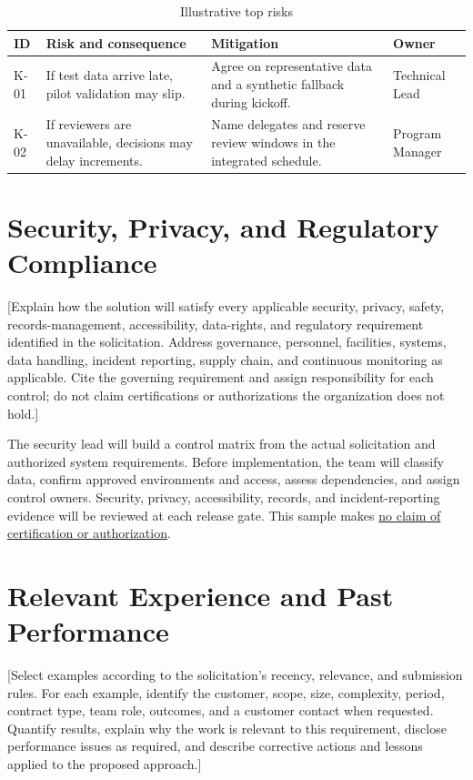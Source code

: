 \begin{table}[htbp]
\centering
\caption{Illustrative top risks}
\label{tab:risks}
\begin{tabularx}{\textwidth}{@{}lXXl@{}}
\toprule
ID & Risk and consequence & Mitigation & Owner \\
\midrule
K-01 & If test data arrive late, pilot validation may slip. & Agree on representative data and a synthetic fallback during kickoff. & Technical Lead \\
K-02 & If reviewers are unavailable, decisions may delay increments. & Name delegates and reserve review windows in the integrated schedule. & Program Manager \\
\bottomrule
\end{tabularx}
\end{table}

\section{Security, Privacy, and Regulatory Compliance}
\label{sec:security}
[Explain how the solution will satisfy every applicable security, privacy,
safety, records-management, accessibility, data-rights, and regulatory
requirement identified in the solicitation. Address governance, personnel,
facilities, systems, data handling, incident reporting, supply chain, and
continuous monitoring as applicable. Cite the governing requirement and assign
responsibility for each control; do not claim certifications or authorizations
the organization does not hold.]

The security lead will build a control matrix from the actual solicitation and
authorized system requirements. Before implementation, the team will classify
data, confirm approved environments and access, assess dependencies, and assign
control owners. Security, privacy, accessibility, records, and incident-reporting
evidence will be reviewed at each release gate. This sample makes \underline{no
claim of certification or authorization}.

\section{Relevant Experience and Past Performance}
\label{sec:experience}
[Select examples according to the solicitation's recency, relevance, and
submission rules. For each example, identify the customer, scope, size,
complexity, period, contract type, team role, outcomes, and a customer contact
when requested. Quantify results, explain why the work is relevant to this
requirement, disclose performance issues as required, and describe corrective
actions and lessons applied to the proposed approach.]

